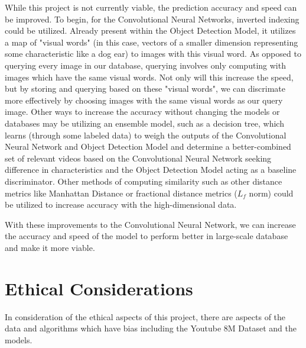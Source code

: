 \documentclass[10pt,twocolumn]{article}
\begin{document}
While this project is not currently viable, the prediction accuracy and speed can be improved. To begin, for the Convolutional Neural Networks, inverted indexing could be utilized. Already present within the Object Detection Model, it utilizes a map of "visual words" (in this case, vectors of a smaller dimension representing some characteristic like a dog ear) to images with this visual word. As opposed to querying every image in our database, querying involves only computing with images which have the same visual words. Not only will this increase the speed, but by storing and querying based on these "visual words", we can discrimate more effectively by choosing images with the same visual words as our query image. Other ways to increase the accuracy without changing the models or databases may be utilizing an ensemble model, such as a decision tree, which learns (through some labeled data) to weigh the outputs of the Convolutional Neural Network and Object Detection Model and determine a better-combined set of relevant videos based on the Convolutional Neural Network seeking difference in characteristics and the Object Detection Model acting as a baseline discriminator. Other methods of computing similarity such as other distance metrics like Manhattan Distance or fractional distance metrics ($L_f$ norm) \cite{Goos2001} could be utilized to increase accuracy with the high-dimensional data.

With these improvements to the Convolutional Neural Network, we can increase the accuracy and speed of the model to perform better in large-scale database and make it more viable.

\section {Ethical Considerations}


In consideration of the ethical aspects of this project, there are aspects of the data and algorithms which have bias including the Youtube 8M Dataset and the models.
\end{document}
